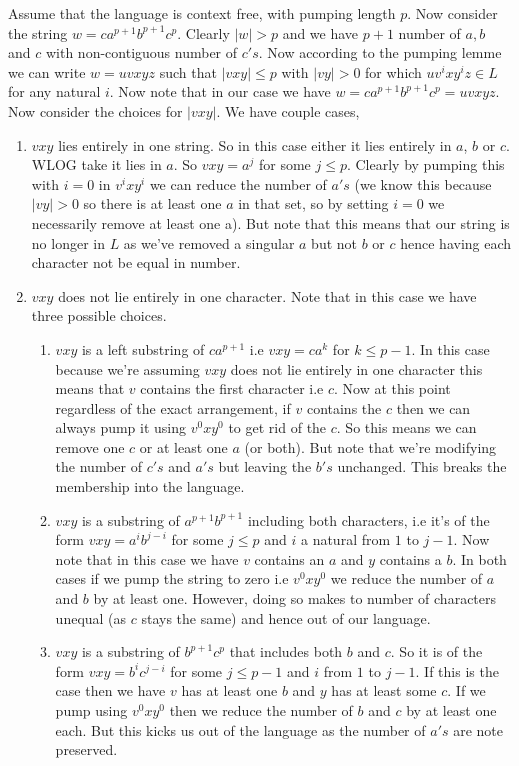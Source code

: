 \documentclass[11pt]{article}
\begin{document}
\begin{enumerate}
\begin{answer}
  Assume that the language is context free, with pumping length $p$. Now consider the string $w = ca^{p + 1}b^{p + 1}c^{p}$. Clearly $|w| > p$ and we have $p + 1$ number of $a, b$ and $c$ with non-contiguous number of $c's$. Now according to the pumping lemme we can write $w = uvxyz$ such that $|vxy| \le p$ with $|vy| > 0$ for which $uv^{i}xy^{i}z \in L$ for any natural $i$. Now note that in our case we have $w = ca^{p + 1}b^{p + 1}c^{p} = uvxyz$. Now consider the choices for $|vxy|$. We have couple cases, 
  \begin{enumerate}
    \item $vxy$ lies entirely in one string. So in this case either it lies entirely in $a$, $b$ or $c$. WLOG take it lies in $a$. So $vxy = a^{j}$ for some $j \le p$. Clearly by pumping this with $i = 0$ in $v^{i}x y^{i}$ we can reduce the number of $a's$ (we know this because $|vy| > 0$ so there is at least one $a$ in that set, so by setting $i = 0$ we necessarily remove at least one a). But note that this means that our string is no longer in $L$ as we've removed a singular $a$ but not $b$ or $c$ hence having each character not be equal in number.

    \item $vxy$ does not lie entirely in one character. Note that in this case we have three possible choices. 

      \begin{enumerate}
        \item $vxy$ is a left substring of $ca^{p + 1}$ i.e $vxy = ca^{k}$ for $k \le p - 1$. In this case because we're assuming $vxy$ does not lie entirely in one character this means that $v$ contains the first character i.e $c$. Now at this point regardless of the exact arrangement, if $v$ contains the $c$ then we can always pump it using $v^{0}x y^{0}$ to get rid of the $c$. So this means we can remove one $c$ or at least one $a$ (or both). But note that we're modifying the number of $c's$ and $a's$ but leaving the $b's$ unchanged. This breaks the membership into the language.
        \item $vxy$ is a substring of $a^{p + 1}b^{p + 1}$ including both characters, i.e it's of the form $vxy = a^{i}b^{j - i}$ for some  $j \le p$ and $i$ a natural from $1$ to $j - 1$. Now note that in this case we have $v$ contains an $a$ and $y$ contains a $b$. In both cases if we pump the string to zero i.e $v^{0}xy^{0}$ we reduce the number of $a$ and $b$ by at least one. However, doing so makes to number of characters unequal (as $c$ stays the same) and hence out of our language.
        \item $vxy$ is a substring of $b^{p + 1}c^{p}$ that includes both $b$ and $c$. So it is of the form $vxy = b^{i} c^{j - i}$ for some $j \le p - 1$ and $i$ from $1$ to $j - 1$. If this is the case then we have $v$ has at least one $b$ and $y$ has at least some $c$. If we pump using $v^{0}x y^{0}$ then we reduce the number of $b$ and $c$ by at least one each. But this kicks us out of the language as the number of $a's$ are note preserved.
      \end{enumerate}


\end{enumerate}
\end{answer}
\end{enumerate}
\end{document}
